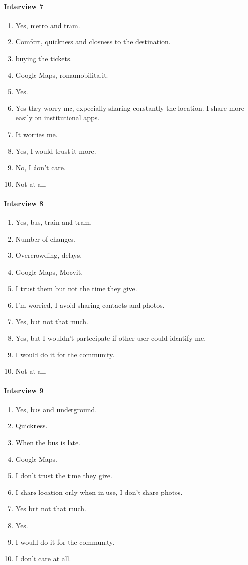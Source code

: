 \documentclass[a4paper, 11pt, twocolumn]{article}
\begin{document}
\paragraph*{Interview 7}\begin{enumerate}
	\item Yes, metro and tram.
	\item Comfort, quickness and closness to the destination.
	\item buying the tickets.
	\item Google Maps, romamobilita.it.
	\item Yes.
	\item Yes they worry me, expecially sharing constantly the location. I share more easily on institutional apps.
	\item It worries me.
	\item Yes, I would trust it more.
	\item No, I don't care.
	\item Not at all.
\end{enumerate}
\paragraph*{Interview 8}\begin{enumerate}
	\item Yes, bus, train and tram.
	\item Number of changes.
	\item Overcrowding, delays.
	\item Google Maps, Moovit.
	\item I trust them but not the time they give.
	\item I'm worried, I avoid sharing contacts and photos.
	\item Yes, but not that much.
	\item Yes, but I wouldn't partecipate if other user could identify me.
	\item I would do it for the community.
	\item Not at all.
\end{enumerate}
\paragraph*{Interview 9}\begin{enumerate}
	\item Yes, bus and underground.
	\item Quickness.
	\item When the bus is late.
	\item Google Maps.
	\item I don't trust the time they give.
	\item I share location only when in use, I don't share photos.
	\item Yes but not that much.
	\item Yes.
	\item I would do it for the community.
	\item I don't care at all.
\end{enumerate}
\end{document}
